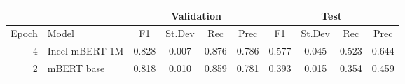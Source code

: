 \begin{tabular}{rl|cccc|cccc}
    \hline
        &                & \multicolumn{4}{c|}{Validation}                 & \multicolumn{4}{c}{Test}                            \\
    \hline
  Epoch &          Model &      F1 &         St.Dev &      Rec &      Prec &       F1 &          St.Dev &     Rec   &       Prec \\
    \hline
      4 & Incel mBERT 1M &   0.828 &          0.007 &    0.876 &     0.786 &    0.577 &           0.045 &     0.523 &      0.644 \\
      2 &     mBERT base &   0.818 &          0.010 &    0.859 &     0.781 &    0.393 &           0.015 &     0.354 &      0.459 \\
 \hline
\end{tabular}
